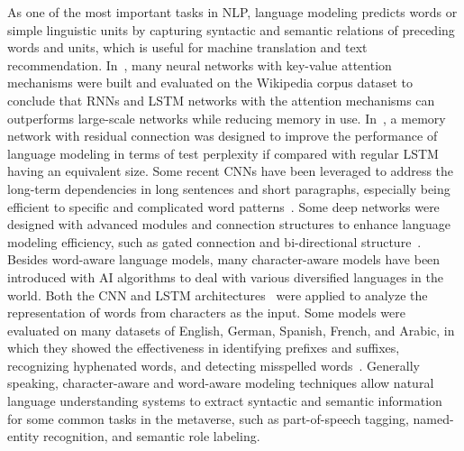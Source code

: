 \documentclass[journal]{IEEEtran}
\begin{document}
As one of the most important tasks in NLP, language modeling predicts words or simple linguistic units by capturing syntactic and semantic relations of preceding words and units, which is useful for machine translation and text recommendation. 
In~\cite{daniluk2017frustratingly}, many neural networks with key-value attention mechanisms were built and evaluated on the Wikipedia corpus dataset to conclude that RNNs and LSTM networks with the attention mechanisms can outperforms large-scale networks while reducing memory in use.
In~\cite{benes2017residual}, a memory network with residual connection was designed to improve the performance of language modeling in terms of test perplexity if compared with regular LSTM~\cite{ jozefowicz2015empirical} having an equivalent size.
Some recent CNNs have been leveraged to address the long-term dependencies in long sentences and short paragraphs, especially being efficient to specific and complicated word patterns~\cite{pham2016convolutional}. Some deep networks were designed with advanced modules and connection structures to enhance language modeling efficiency, such as gated connection and bi-directional structure~\cite{liu2020chinese}.
Besides word-aware language models, many character-aware models have been introduced with AI algorithms to deal with various diversified languages in the world. Both the CNN and LSTM architectures~\cite{athiwaratkun2017malware} were applied to analyze the representation of words from characters as the input. Some models were evaluated on many datasets of English, German, Spanish, French, and Arabic, in which they showed the effectiveness in identifying prefixes and suffixes, recognizing hyphenated words, and detecting misspelled words~\cite{ma2020charbert, sharma2020deep, khysru2021tibetan}. Generally speaking, character-aware and word-aware modeling techniques allow natural language understanding systems to extract syntactic and semantic information for some common tasks in the metaverse, such as part-of-speech tagging, named-entity recognition, and semantic role labeling.
\end{document}
